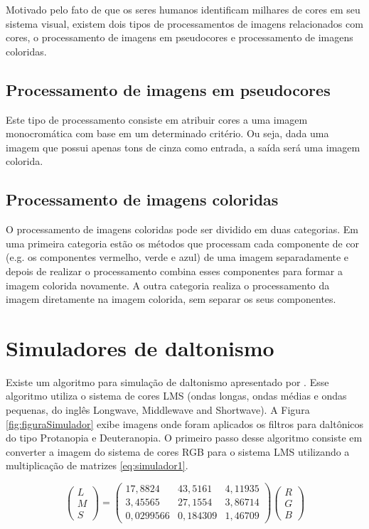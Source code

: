 \documentclass[	12pt, Times, openright, twoside, a4paper, english, brazil]{abntex2}
\begin{document}
Motivado pelo fato de que os seres humanos identificam milhares de cores em seu sistema visual, existem dois tipos de processamentos de imagens relacionados com cores, o processamento de imagens em pseudocores e processamento de imagens coloridas.

\subsection{Processamento de imagens em pseudocores}
Este tipo de processamento consiste em atribuir cores a uma imagem monocromática com base em um determinado critério. Ou seja, dada uma imagem que possui apenas tons de cinza como entrada, a saída será uma imagem colorida.

\subsection{Processamento de imagens coloridas}

O processamento de imagens coloridas pode ser dividido em duas categorias. Em uma primeira categoria estão os métodos que processam cada componente de cor (e.g. os componentes vermelho, verde e azul) de uma imagem separadamente e depois de realizar o processamento combina esses componentes para formar a imagem colorida novamente. A outra categoria realiza o processamento da imagem diretamente na imagem colorida, sem separar os seus componentes.

\section{Simuladores de daltonismo}

Existe um algoritmo para simulação de daltonismo apresentado por . Esse algoritmo utiliza o sistema de cores LMS (ondas longas, ondas médias e ondas pequenas, do inglês Longwave, Middlewave and Shortwave). A Figura \ref{fig:figuraSimulador} exibe imagens onde foram aplicados os filtros para daltônicos do tipo Protanopia e Deuteranopia. O primeiro passo desse algoritmo consiste em converter a imagem do sistema de cores RGB para o sistema LMS utilizando a multiplicação de matrizes \ref{eq:simulador1}.

\begin{equation}
\left(\begin{array}{ccc}
L\\M\\S
\end{array}\right)
=
\left(\begin{array}{ccc}
17,8824 & 43,5161 & 4,11935 \\
3,45565 & 27,1554 & 3,86714 \\
0,0299566 & 0,184309 & 1,46709
\end{array}\right)
\left(\begin{array}{ccc}
R\\G\\B
\end{array}\right)
\label{eq:simulador1}
\end{equation}
\end{document}
